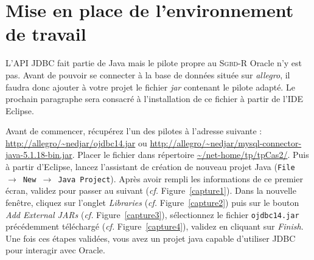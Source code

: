 \documentclass[a4paper,11pt]{article}
\begin{document}
\section{Mise en place de l'environnement de travail}

L'API JDBC fait partie de Java mais le pilote propre au \textsc{Sgbd-R} Oracle n'y est pas. Avant de pouvoir se connecter 
à la base de données située sur \emph{allegro}, il faudra donc ajouter à votre projet le fichier \emph{jar} contenant le pilote 
adapté. Le prochain paragraphe sera consacré à l'installation de ce fichier à partir de l'IDE Eclipse.

Avant de commencer, récupérez l'un des pilotes à l'adresse suivante : \url{http://allegro/~nedjar/ojdbc14.jar} ou 
\url{http://allegro/~nedjar/mysql-connector-java-5.1.18-bin.jar}. 
Placer le fichier dans répertoire \url{~/net-home/tp/tpCas2/}. Puis à partir d'Eclipse, lancez 
l'assistant de création de nouveau projet Java (\texttt{File $\rightarrow$ New $\rightarrow$ Java Project}).
Après avoir rempli les informations de ce premier écran, validez pour passer au suivant (\emph{cf.} Figure~\ref{capture1}).
Dans la nouvelle fenêtre, cliquez sur l'onglet \emph{Libraries} (\emph{cf.} Figure~\ref{capture2})
puis sur le bouton \emph{Add External JARs} (\emph{cf.} Figure~\ref{capture3}), sélectionnez le fichier \texttt{ojdbc14.jar} 
précédemment téléchargé (\emph{cf.} Figure~\ref{capture4}), validez en cliquant sur \emph{Finish}. Une fois ces étapes validées, 
vous avez un projet java capable d'utiliser JDBC pour interagir avec Oracle.
\end{document}
